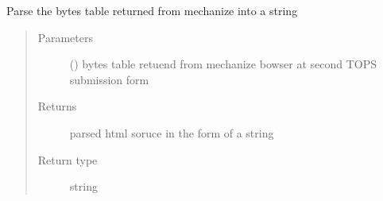 \documentclass[letterpaper,10pt,english]{sphinxmanual}
\begin{document}
\begin{fulllineitems}
\label{\detokenize{pyTOPSScrape.api:pyTOPSScrape.api.api.parse_table}}
\sphinxAtStartPar
Parse the bytes table returned from mechanize into a string
\begin{quote}\begin{description}
\item[{Parameters}] \leavevmode
\sphinxAtStartPar
{} () \textendash{} bytes table retuend from mechanize bowser at second TOPS submission
form

\item[{Returns}] \leavevmode
\sphinxAtStartPar
{} \textendash{} parsed html soruce in the form of a string

\item[{Return type}] \leavevmode
\sphinxAtStartPar
string

\end{description}\end{quote}

\end{fulllineitems}

\end{document}
